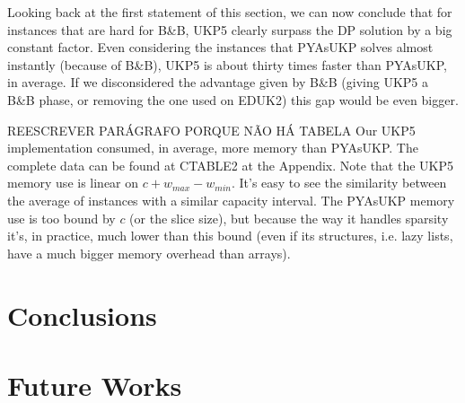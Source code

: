 \documentclass[runningheads,a4paper]{llncs}
\begin{document}
Looking back at the first statement of this section, we can now conclude that for instances that are hard for B\&B, UKP5 clearly surpass the DP solution by a big constant factor. Even considering the instances that PYAsUKP solves almost instantly (because of B\&B), UKP5 is about thirty times faster than PYAsUKP, in average. If we disconsidered the advantage given by B\&B (giving UKP5 a B\&B phase, or removing the one used on EDUK2) this gap would be even bigger.

REESCREVER PARÁGRAFO PORQUE NÃO HÁ TABELA Our UKP5 implementation consumed, in average, more memory than PYAsUKP. The complete data can be found at CTABLE2 at the Appendix. Note that the UKP5 memory use is linear on \(c + w_{max} - w_{min}\). It's easy to see the similarity between the average of instances with a similar capacity interval. The PYAsUKP memory use is too bound by \(c\) (or the slice size), but because the way it handles sparsity it's, in practice, much lower than this bound (even if its structures, i.e. lazy lists, have a much bigger memory overhead than arrays).

\section{Conclusions}

\section{Future Works}
\end{document}

